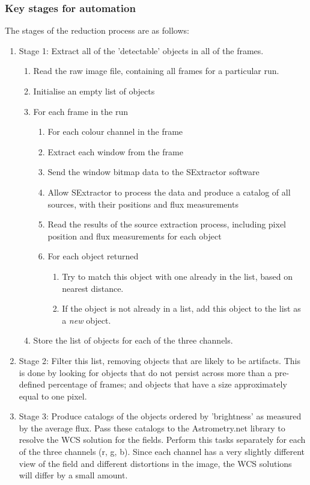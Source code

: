 \subsubsection{Key stages for automation}
The stages of the reduction process are as follows:
\begin{enumerate}
	\item Stage 1: Extract all of the 'detectable' objects in all of the frames. 
	\begin{enumerate}
		\item Read the raw image file, containing all frames for a particular run.
		\item Initialise an empty list of objects
		\item For each frame in the run
		\begin{enumerate}
			\item For each colour channel in the frame
			\item Extract each window from the frame
			\item Send the window bitmap data to the SExtractor software
			\item Allow SExtractor to process the data and produce a catalog of all sources, with their positions and flux measurements
			\item Read the results of the source extraction process, including pixel position and flux measurements for each object
			\item For each object returned
			\begin{enumerate} 
				\item Try to match this object with one already in the list, based on nearest distance.
				\item If the object is not already in a list, add this object to the list as a \emph{new} object.
			\end{enumerate}
		\end{enumerate}
		\item Store the list of objects for each of the three channels.
	\end{enumerate}
	\item Stage 2: Filter this list, removing objects that are likely to be artifacts. This is done by looking for objects that do not persist across more than a pre-defined percentage of frames; and objects that have a size approximately equal to one pixel. 
	\item Stage 3: Produce catalogs of the objects ordered by 'brightness' as measured by the average flux. Pass these catalogs to the Astrometry.net library to resolve the WCS solution for the fields. Perform this tasks separately for each of the three channels (r, g, b). Since each channel has a very slightly different view of the field and different distortions in the image, the WCS solutions will differ by a small amount.

\end{enumerate}
